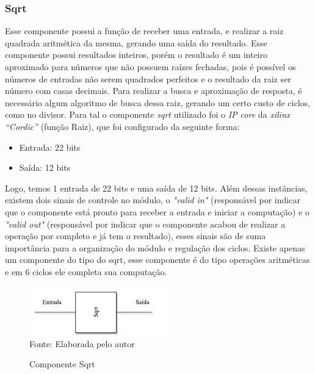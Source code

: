 \subsubsection{Sqrt}
Esse componente possui a função de receber uma entrada, e realizar a raiz quadrada aritmética da mesma, gerando uma saída do resultado. Esse componente possui resultados inteiros, porém o resultado é um inteiro aproximado para números que não possuem raízes fechadas, pois é possível os números de entradas não serem quadrados perfeitos e o resultado da raiz ser número com casas decimais. Para realizar a busca e aproximação de resposta, é necessário algum algoritmo de busca dessa raiz, gerando um certo custo de ciclos, como no divisor. Para tal o componente \textit{sqrt} utilizado foi o \textit{IP core} da \textit{xilinx “Cordic”} (função Raiz), que foi configurado da seguinte forma: 
\begin{itemize}
	\item Entrada: 22 bits
	\item Saída: 12 bits
\end{itemize}
Logo, temos 1 entrada de 22 bits e uma saída de 12 bits. Além dessas instâncias, existem dois sinais de controle no módulo, o \textit{"valid in"} (responsável por indicar que o componente está pronto para receber a entrada e iniciar a computação) e o \textit{"valid out"} (responsável por indicar que o componente acabou de realizar a operação por completo e já tem o resultado), esses sinais são de suma importância para a organização do módulo e regulação dos ciclos. Existe apenas um componente do tipo do sqrt, esse componente é do tipo operações aritméticas e em 6 ciclos ele completa sua computação.

\begin{figure}[H]
	\centering
	\caption{Componente Sqrt}
	\includegraphics[width=6cm]{figures/sqrt.pdf}\\
	
	
	{Fonte: Elaborada pelo autor}
	\label{Sqrt}
\end{figure}

